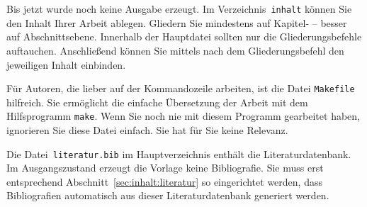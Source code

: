 Bis jetzt wurde noch keine Ausgabe erzeugt. Im Verzeichnis~\texttt{inhalt}
können Sie den Inhalt Ihrer Arbeit ablegen. Gliedern Sie mindestens auf
Kapitel- -- besser auf Abschnittsebene. Innerhalb der Hauptdatei sollten
nur die Gliederungsbefehle auftauchen. Anschließend können Sie mittels
\verb++ nach dem Gliederungsbefehl den jeweiligen Inhalt einbinden.

Für Autoren, die lieber auf der Kommandozeile arbeiten, ist die Datei
\texttt{Makefile} hilfreich. Sie ermöglicht die einfache Übersetzung der
Arbeit mit dem Hilfsprogramm \texttt{make}. Wenn Sie noch nie mit diesem
Programm gearbeitet haben, ignorieren Sie diese Datei einfach. Sie hat für
Sie keine Relevanz.

Die Datei~\texttt{literatur.bib} im Hauptverzeichnis enthält die
Literaturdatenbank. Im Ausgangszustand erzeugt die Vorlage keine Bibliografie.
Sie muss erst entsprechend Abschnitt~\ref{sec:inhalt:literatur} so eingerichtet
werden, dass Bibliografien automatisch aus dieser Literaturdatenbank generiert
werden.
